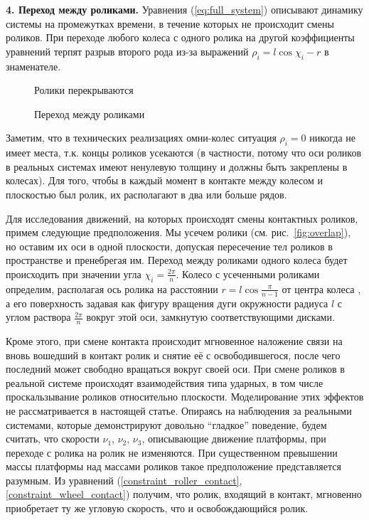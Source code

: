 {\bf 4. Переход между роликами.}
Уравнения (\ref{eq:full_system}) описывают динамику системы на промежутках времени, в течение которых не происходит смены роликов. 
При переходе любого колеса с одного ролика на другой коэффициенты уравнений терпят разрыв второго рода из-за выражений $\rho_i = l\cos\chi_i-r$ в знаменателе.

\begin{figure}
        \centering
        \caption{Ролики перекрываются}
        \label{fig:overlap}
    \endminipage
        \centering
        \caption{Переход между роликами}
        \label{fig:change}
    \endminipage
\end{figure}

Заметим, что в технических реализациях омни-колес ситуация $\rho_i = 0$ никогда не имеет места, т.к. концы роликов усекаются (в частности, потому что оси роликов в реальных системах имеют ненулевую толщину и должны быть закреплены в колесах). Для того, чтобы в каждый момент в контакте между колесом и плоскостью был ролик, их располагают в два или больше рядов. %

Для исследования движений, на которых происходят смены контактных роликов, примем следующие предположения. Мы усечем ролики (см. рис.~\ref{fig:overlap}), но оставим их оси в одной плоскости, допуская пересечение тел роликов в пространстве и пренебрегая им. Переход между роликами одного колеса будет происходить при значении угла $\chi_i = \frac{2\pi}{n}$. Колесо с усеченными роликами определим, располагая ось ролика на расстоянии $r = l\cos\frac{\pi}{n-1}$ от центра колеса
, а его поверхность задавая как фигуру вращения дуги окружности радиуса $l$ с углом раствора $\frac{2\pi}{n}$ вокруг этой оси, замкнутую соответствующими дисками.

Кроме этого, при смене контакта происходит мгновенное наложение связи на вновь вошедший в контакт ролик и снятие её с освободившегося, после чего последний может свободно вращаться вокруг своей оси. При смене роликов в реальной системе происходят взаимодействия типа ударных, в том числе проскальзывание роликов относительно плоскости. Моделирование этих эффектов не рассматривается в настоящей статье. Опираясь на наблюдения за реальными системами, которые демонстрируют довольно ``гладкое'' поведение, будем считать, что скорости $\nu_1$, $\nu_2$, $\nu_3$, описывающие движение платформы, при переходе с ролика на ролик не изменяются. При существенном превышении массы платформы над массами роликов такое предположение представляется разумным. Из уравнений (\ref{constraint_roller_contact}, \ref{constraint_wheel_contact}) получим, что ролик, входящий в контакт, мгновенно приобретает ту же угловую скорость, что и освобождающийся ролик.

